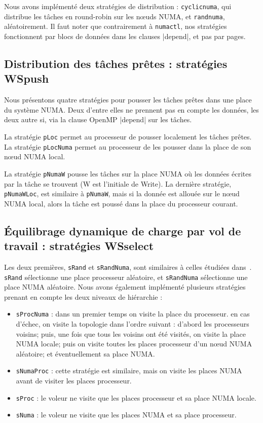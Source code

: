 \documentclass[parallelisme]{compas2016}
\begin{document}
Nous avons implémenté deux stratégies de distribution : \verb/cyclicnuma/, qui
distribue les tâches en round-robin sur les nœuds NUMA, et \verb/randnuma/, aléatoirement.
Il faut noter que contrairement à \verb/numactl/, nos stratégies fonctionnent
par blocs de données dans les clauses |depend|, et pas par pages.


\vspace*{-1ex}
\subsection{Distribution des tâches prêtes : stratégies WSpush}

Nous présentons quatre stratégies pour pousser les tâches prêtes dans une place
du système NUMA. Deux d'entre elles ne prennent pas en compte les données, les deux
autre si, via la clause OpenMP |depend| sur les tâches.

La stratégie \verb/pLoc/ permet au processeur de pousser localement les tâches prêtes.
La stratégie \verb/pLocNuma/ permet au processeur de les pousser dans la place de son nœud NUMA local.

La stratégie \verb/pNumaW/ pousse les tâches sur la place NUMA où les données
écrites par la tâche se trouvent (W est l'initiale de Write).
La dernière stratégie, \verb/pNumaWLoc/, est similaire à \verb/pNumaW/, mais
si la donnée est allouée sur le nœud NUMA local, alors la tâche est poussé dans
la place du processeur courant.


\vspace*{-1ex}
\subsection{Équilibrage dynamique de charge par vol de travail : stratégies WSselect}

Les deux premières, \verb/sRand/ et \verb/sRandNuma/, sont similaires à celles étudiées
dans~\cite{DBLP:journals/ijhpca/OlivierPWSP12}. \verb/sRand/ sélectionne une place
processeur aléatoire, et \verb/sRandNuma/ sélectionne une place NUMA aléatoire.
Nous avons également implémenté plusieurs stratégies prenant en compte les deux niveaux
de hiérarchie :

\begin{itemize}
  \item \verb/sProcNuma/ : dans un premier temps on visite la place du processeur.
    en cas d'échec, on visite la topologie dans l'ordre suivant : d'abord les
    processeurs voisins; puis, une fois que tous les voisins ont été visités, on
    visite la place NUMA locale; puis on visite toutes les places processeur d'un
    nœud NUMA aléatoire; et éventuellement sa place NUMA.
    
  \item \verb/sNumaProc/ : cette stratégie est similaire, mais on visite les places
    NUMA avant de visiter les places processeur.
  \item \verb/sProc/ : le voleur ne visite que les places processeur et sa place
    NUMA locale.
  \item \verb/sNuma/ : le voleur ne visite que les places NUMA et sa place processeur.
\end{itemize}
\end{document}
